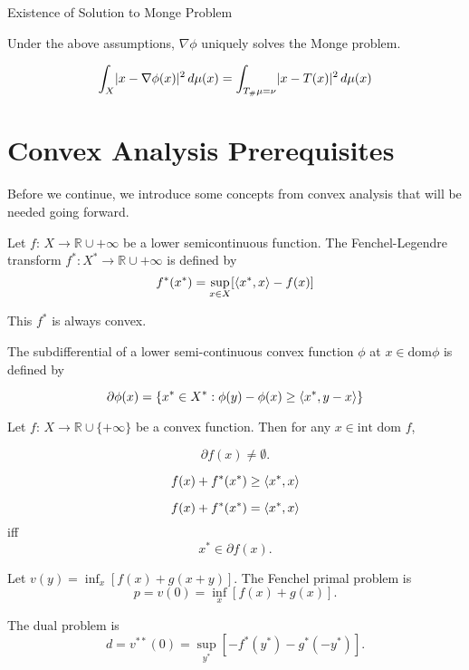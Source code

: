 \begin{corollary}{Existence of Solution to Monge Problem}
	
Under the above assumptions, $\nabla \phi$ uniquely solves the Monge problem.

\[
\int_X \abs{x-\nabla\phi(x)}^2\,d\mu(x) = \int_{T_{\#}\mu=\nu}\abs{x-T(x)}^2\,d\mu(x)
\]
	
\end{corollary}

\section*{Convex Analysis Prerequisites}

Before we continue, we introduce some concepts from convex analysis that will be needed going forward.

\begin{definition}
	Let $f:\,X\to \mathbb{R}\cup +\infty$ be a lower semicontinuous function. The Fenchel-Legendre transform $f^{*}: X^{*}\to \mathbb{R}\cup +\infty$ is defined by
	$$
	f^{*}(x^{*}) = \sup_{x\in X} [\ang*{x^{*},x}-f(x)]
	$$
	
	This $f^{*}$ is always convex.
\end{definition}

\begin{definition}
	The subdifferential of a lower semi-continuous convex function $\phi$ at $x\in \textrm{dom} \phi$ is defined by
	
	$$
	\partial \phi(x) = \{ x^{*}\in X^{*}: \phi(y)-\phi(x)\geq \ang*{x^{*},y-x} \}
	$$
\end{definition}

\begin{corollary}
	Let $f:\,X\to \mathbb{R}\cup \{+\infty\}$ be a convex function. Then for any $x\in \textrm{int dom }f$,
	
	$$ \partial f(x)\neq \emptyset.$$
\end{corollary}

\begin{theorem}
	$$f(x)+f^{*}(x^{*})\geq \ang*{x^{*},x}$$
\end{theorem}

\begin{corollary}
	$$f(x)+f^{*}(x^{*})= \ang*{x^{*},x}$$ iff
	$$x^{*}\in \partial f(x).$$
\end{corollary}

\begin{theorem}
	Let $v(y) = \inf_x [f(x)+g(x+y)].$ The Fenchel primal problem is
	$$p = v(0) = \inf_x [f(x)+g(x)].$$
	
	The dual problem is
	$$d = v^{**}(0)=\sup_{y^{*}} [-f^{*}(y^{*})-g^{*}(-y^{*})].$$
\end{theorem}

